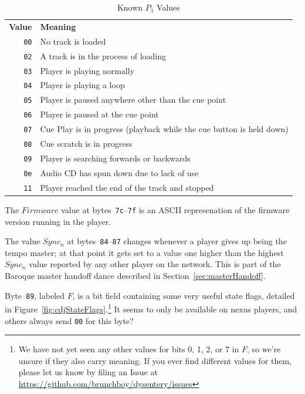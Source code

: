 \documentclass[11pt]{article}
\begin{document}
\begin{longtabu}{rX}
  \toprule

  {\bfseries Value} & {\bfseries Meaning} \endhead

  \bottomrule \\
  \caption{Known $P_1$ Values} \endfoot

  {\tt 00} & No track is loaded \label{table:p1Values} \\

  {\tt 02} & A track is in the process of loading \\

  {\tt 03} & Player is playing normally \\

  {\tt 04} & Player is playing a loop \\

  {\tt 05} & Player is paused anywhere other than the cue point \\

  {\tt 06} & Player is paused at the cue point \\

  {\tt 07} & Cue Play is in progress (playback while the cue button is
  held down) \\

  {\tt 08} & Cue scratch is in progress \\

  {\tt 09} & Player is searching forwards or backwards \\

  {\tt 0e} & Audio CD has spun down due to lack of use \\

  {\tt 11} & Player reached the end of the track and stopped \\

\end{longtabu}

The $Firmware$ value at bytes~{\tt 7c}--{\tt 7f} is an ASCII
represenation of the firmware version running in the player.

The value $Sync_n$ at bytes~{\tt 84}--{\tt 87} changes whenever a
player gives up being the tempo master; at that point it gets set to a
value one higher than the highest $Sync_n$ value reported by any other
player on the network. This is part of the Baroque master handoff
dance described in Section~\ref{sec:masterHandoff}.

Byte~{\tt 89}, labeled $F$, is a bit field containing some very useful
state flags, detailed in Figure~\ref{fig:cdjStateFlags}.\footnote{We
  have not yet seen any other values for bits 0, 1, 2, or 7 in $F$, so
  we're unsure if they also carry meaning. If you ever find different
  values for them, please let us know by filing an Issue at
  \url{https://github.com/brunchboy/dysentery/issues}} It seems to
only be available on nexus players, and others always send {\tt 00}
for this byte?
\end{document}
